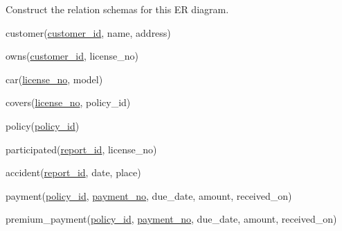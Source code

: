 \documentclass[a4 paper]{article}
\begin{document}
\noindent Construct the relation schemas for this ER diagram.

customer(\underline{customer\_id}, name, address)

owns(\underline{customer\_id}, license\_no)

car(\underline{license\_no}, model)

covers(\underline{license\_no}, policy\_id)

policy(\underline{policy\_id})

participated(\underline{report\_id}, license\_no)

accident(\underline{report\_id}, date, place)

payment(\underline{policy\_id}, \underline{payment\_no}, due\_date, amount, received\_on)

premium\_payment(\underline{policy\_id}, \underline{payment\_no}, due\_date, amount, received\_on)
\end{document}
